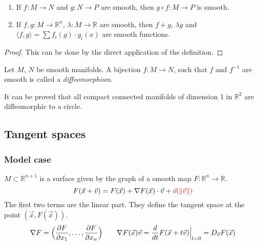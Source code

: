 \begin{proposition}
    \label{prop:propTwoIdk}
    \begin{enumerate}
        \item {
            If $f : M \to N$ and $g : N \to P$ are smooth, then 
            $g \circ f : M \to P$ is smooth.
        }
        \item {
            If $f, g : M \to \mathbb{R}^n$, $\lambda : M \to \mathbb{R}$
            are smooth, then $f + g$, $\lambda g$ and
            $\langle f, g \rangle = \sum f_i(g) \cdot g_i(x)$ are
            smooth functions.
        }
    \end{enumerate}
\end{proposition}
\begin{proof}
    This can be done by the direct application of the definition.
\end{proof}
\begin{definition}[Diffeomorphism]
    Let $M$, $N$  be smooth manifolds. A bijection $f : M \to N$,
    such that $f$ and $f^{-1}$ are smooth is called a 
    \textit{diffeomorphism}.
\end{definition}
\begin{example}
    It can be proved that all compact connected manifolds of dimension 1
    in $\mathbb{R}^2$ are diffeomorphic to a circle.
\end{example}

\subsection{Tangent spaces}
\subsubsection*{Model case}
$M \subset \mathbb{R}^{n+1}$ is a surface given by the graph
of a smooth map $F : \mathbb{R}^n \to \mathbb{R}$.
\[ 
    F(\vec{x} + \vec{v}) = F(\vec{x}) + \nabla F(\vec{x}) \cdot \vec{v} + 
    \textcolor{red}{\vec{o}(\lVert\vec{v}\rVert)}
\]
The first two terms are the linear part. They define the tangent space at the point $(\vec{x}, F(\vec{x}))$.
\[
    \nabla F =\Bigl( \frac{\partial F}{\partial x_1}, \dots, 
    \frac{\partial F}{\partial x_n} \Bigr)
    \qquad
    \nabla F(\vec{x}) \vec{v} = \frac{d}{dt} F(\vec{x} + t\vec{v})\Big|_{t=0} =
    D_{\vec{v}} F(\vec{x})
\]
